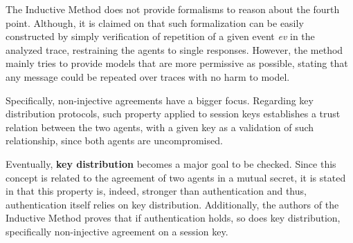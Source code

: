 The Inductive Method does not provide formalisms to reason about the fourth point. Although, it is claimed on \cite{bella-book} that such formalization can be easily constructed by simply verification of repetition of a given event \textit{ev} in the analyzed trace, restraining the agents to single responses. However, the method mainly tries to provide models that are more permissive as possible, stating that any message could be repeated over traces with no harm to model.

Specifically, non-injective agreements have a bigger focus. Regarding key distribution protocols, such property applied to session keys establishes a trust relation between the two agents, with a given key as a validation of such relationship, since both agents are uncompromised.

Eventually, \textbf{key distribution} becomes a major goal to be checked. Since this concept is related to the agreement of two agents in a mutual secret, it is stated in \cite{auth:bellare-rogaway} that this property is, indeed, stronger than authentication and thus, authentication itself relies on key distribution. Additionally, the authors of the Inductive Method proves that if authentication holds, so does key distribution, specifically non-injective agreement on a session key.
